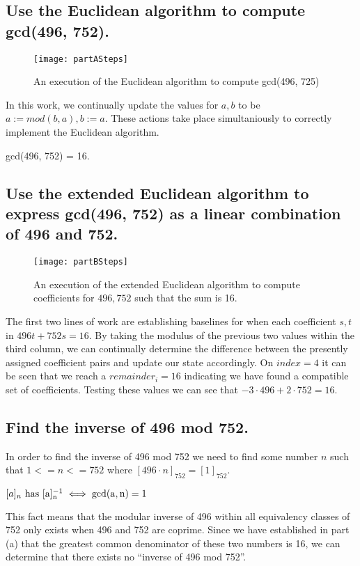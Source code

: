 \subsection{Use the Euclidean algorithm to compute gcd(496, 752).}
\begin{figure}[H]
\centering
\texttt{[image: partASteps]}
\caption{An execution of the Euclidean algorithm to compute gcd(496, 725)}
\end{figure}

In this work, we continually update the values for $a,b$ to be $a := mod(b,a), b := a$. These actions take place simultaniously to correctly implement the Euclidean algorithm.

gcd(496, 752) = 16.

\subsection{Use the extended Euclidean algorithm to express gcd(496, 752) as a linear combination of 496
and 752.}
\begin{figure}[H]
\centering
\texttt{[image: partBSteps]}
\caption{An execution of the extended Euclidean algorithm to compute coefficients for $496, 752$ such that the sum is 16.}
\end{figure}

The first two lines of work are establishing baselines for when each coefficient $s,t$ in $496t + 752s = 16$. By taking the modulus of the previous two values within the third column, we can continually determine the difference between the presently assigned coefficient pairs and update our state accordingly. On $index = 4$ it can be seen that we reach a $remainder_i=16$ indicating we have found a compatible set of coefficients. Testing these values we can see that $-3\cdot 496 + 2\cdot 752 = 16$.

\subsection{Find the inverse of 496 mod 752.}
In order to find the inverse of 496 mod 752 we need to find some number $n$ such that $1 <= n <= 752$ where $[496 \cdot n]_{752} = [1]_{752}$.

\begin{fact}
$[a]_n \rm{~has~} [a]_n^{-1} \iff \rm{gcd}(a,n)=1$
\end{fact}

This fact means that the modular inverse of 496 within all equivalency classes of 752 only exists when 496 and 752 are coprime. Since we have established in part (a) that the greatest common denominator of these two numbers is 16, we can determine that there exists no ``inverse of 496 mod 752''.